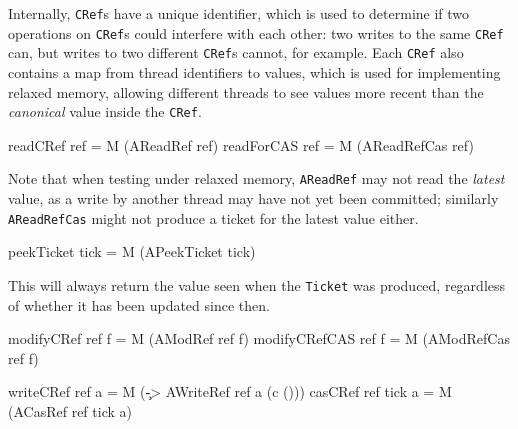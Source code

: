 Internally, \verb|CRef|s have a unique identifier, which is used to
determine if two operations on \verb|CRef|s could interfere with each
other: two writes to the same \verb|CRef| can, but writes to two
different \verb|CRef|s cannot, for example. Each \verb|CRef| also
contains a map from thread identifiers to values, which is used for
implementing relaxed memory, allowing different threads to see values
more recent than the \emph{canonical} value inside the \verb|CRef|.

\begin{haskellcode}
readCRef   ref = M (AReadRef    ref)
readForCAS ref = M (AReadRefCas ref)
\end{haskellcode}



Note that when testing under relaxed memory, \verb|AReadRef| may not
read the \emph{latest} value, as a write by another thread may have
not yet been committed; similarly \verb|AReadRefCas| might not produce
a ticket for the latest value either.

\begin{haskellcode}
peekTicket tick = M (APeekTicket tick)
\end{haskellcode}


This will always return the value seen when the \verb|Ticket| was
produced, regardless of whether it has been updated since then.

\begin{haskellcode}
modifyCRef    ref f = M (AModRef    ref f)
modifyCRefCAS ref f = M (AModRefCas ref f)
\end{haskellcode}



\begin{haskellcode}
writeCRef ref      a = M (\c -> AWriteRef ref a (c ()))
casCRef   ref tick a = M (ACasRef ref tick a)
\end{haskellcode}

